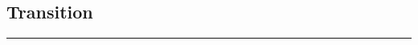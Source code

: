 \documentclass[a4paper,12pt]{article}
\begin{document}
\vspace{0em} %
\vspace{-1em} %

\clearpage





\subsection{Transition}

\vspace{1em} %
\hrule height 1pt width 1\textwidth %
\vspace{0em} %
\end{document}
